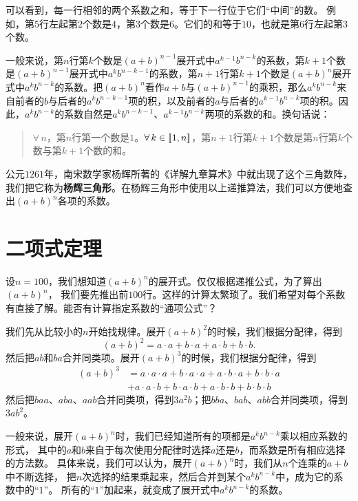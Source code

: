 \documentclass[12pt,UTF8,fontset=none]{ctexbook}
\begin{document}
可以看到，每一行相邻的两个系数之和，等于下一行位于它们“中间”的数。
例如，第$5$行左起第$2$个数是$4$，第$3$个数是$6$。它们的和等于$10$，也就是第$6$行左起第$3$个数。

一般来说，第$n$行第$k$个数是$(a+b)^{n-1}$展开式中$a^{k-1}b^{n-k}$的系数，第$k+1$个数是$(a+b)^{n-1}$展开式中$a^{k}b^{n-k-1}$的系数，第$n+1$行第$k+1$个数是$(a+b)^{n}$展开式中$a^{k}b^{n-k}$的系数。把$(a+b)^n$看作$a+b$与$(a+b)^{n-1}$的乘积，那么$a^{k}b^{n-k}$来自前者的$b$与后者的$a^{k}b^{n-k-1}$项的积，以及前者的$a$与后者的$a^{k-1}b^{n-k}$项的积。因此，$a^{k}b^{n-k}$的系数自然是$a^{k}b^{n-k-1}$、$a^{k-1}b^{n-k}$两项的系数的和。换句话说：
\begin{quotation}
    $\forall \, n$，第$n$行第一个数是$1$。$\forall \, k \in [\![1,n]\!]$，第$n+1$行第$k+1$个数是第$n$行第$k$个数与第$k+1$个数的和。
\end{quotation}

公元$1261$年，南宋数学家杨辉所著的《详解九章算术》中就出现了这个三角数阵，
我们把它称为\textbf{杨辉三角形}。在杨辉三角形中使用以上递推算法，我们可以方便地查出$(a+b)^n$各项的系数。

\section{二项式定理}

设$n=100$，我们想知道$(a+b)^n$的展开式。仅仅根据递推公式，为了算出$(a+b)^n$，
我们要先推出前$100$行。这样的计算太繁琐了。我们希望对每个系数有直接了解。能否有计算指定系数的“通项公式”？

我们先从比较小的$n$开始找规律。展开$(a+b)^2$的时候，我们根据分配律，得到
$$ (a+b)^2 = a\cdot a + b\cdot a + a\cdot b + b\cdot b. $$
然后把$ab$和$ba$合并同类项。展开$(a+b)^3$的时候，我们根据分配律，得到
\begin{align*}
 (a+b)^3 &= a\cdot a\cdot a + b\cdot a\cdot a + a\cdot b\cdot a + b\cdot b\cdot a \\
  &+ a\cdot a\cdot b + b\cdot a\cdot b + a\cdot b\cdot b + b\cdot b\cdot b  
\end{align*}
然后把$baa$、$aba$、$aab$合并同类项，得到$3a^2b$；把$bba$、$bab$、$abb$合并同类项，得到$3ab^2$。

一般来说，展开$(a+b)^n$时，我们已经知道所有的项都是$a^kb^{n-k}$乘以相应系数的形式，
其中的$a$和$b$来自于每次使用分配律时选择$a$还是$b$，而系数是所有相应选择的方法数。
具体来说，我们可以认为，展开$(a+b)^n$时，我们从$n$个连乘的$a+b$中不断选择，
把$n$次选择的结果乘起来，然后合并到某个$a^kb^{n-k}$中，成为它的系数中的“$1$”。
所有的“$1$”加起来，就变成了展开式中$a^kb^{n-k}$的系数。
\end{document}
